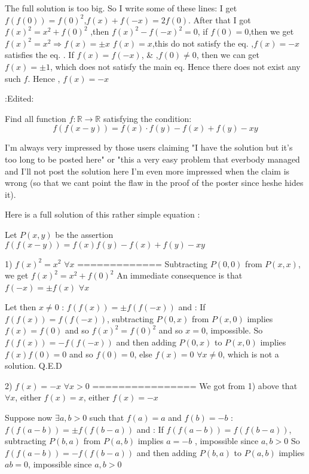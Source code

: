 \begin{solution}
	The full solution is too big. So I write some of these lines:
I get $f(f(0))=f(0)^2$,$f(x)+f(-x)=2f(0)$.
After that I got $f(x)^2=x^2+f(0)^2$ ,then $f(x)^2-f(-x)^2=0$, if $f(0)=0$,then we get $f(x)^2=x^2\Rightarrow{f(x)=\pm{x}}$
$f(x)=x$,this do not satisfy the eq. ,$f(x)=-x$ satisfies the eq. .
 If $f(x)=f(-x)$, & ,$f(0)\ne{0}$, then we can get $f(x)=\pm{1}$, which does not satisfy the main eq. Hence there does not exist any such $f$.
Hence  , $f(x)=-x$

:Edited:
\end{solution}



\begin{solution}
	\begin{tcolorbox}Find all function $ f: \mathbb R\to \mathbb R$ satisfying the condition:
\[ f(f(x - y)) = f(x)\cdot f(y) - f(x) + f(y) - xy
\]\end{tcolorbox}
I'm always very impressed by those users claiming "I have the solution but it's too long to be posted here" or "this a very easy problem that everbody managed and I'll not post the solution here 
I'm even more impressed when the claim is wrong (so that we cant point the flaw in the proof of the poster since he\/she hides it).

Here is a full solution of this rather simple equation :

Let $P(x,y)$ be the assertion $f(f(x-y))=f(x)f(y)-f(x)+f(y)-xy$

1) $f(x)^2=x^2$ $\forall x$
=============
Subtracting $P(0,0)$ from $P(x,x)$, we get $f(x)^2=x^2+f(0)^2$
An immediate consequence is that $f(-x)=\pm f(x)$ $\forall x$

Let then $x\ne 0$ : $f(f(x))=\pm f(f(-x))$ and :
If $f(f(x))=f(f(-x))$, subtracting $P(0,x)$ from $P(x,0)$ implies $f(x)=f(0)$ and so $f(x)^2=f(0)^2$ and so $x=0$, impossible.
So $f(f(x))=-f(f(-x))$ and then adding $P(0,x)$ to $P(x,0)$ implies $f(x)f(0)=0$ and so $f(0)=0$, else $f(x)=0$ $\forall x\ne 0$, which is not a solution.
Q.E.D

2) $f(x)=-x$ $\forall x>0$
================
We got from 1) above that $\forall x$, either $f(x)=x$, either $f(x)=-x$

Suppose now $\exists a,b>0$ such that $f(a)=a$ and $f(b)=-b$ :
$f(f(a-b))=\pm f(f(b-a))$ and :
If $f(f(a-b))=f(f(b-a))$, subtracting $P(b,a)$ from $P(a,b)$ implies $a=-b$ , impossible since $a,b>0$
So $f(f(a-b))=-f(f(b-a))$ and then adding $P(b,a)$ to $P(a,b)$ implies $ab=0$, impossible since $a,b>0$


\end{solution}
